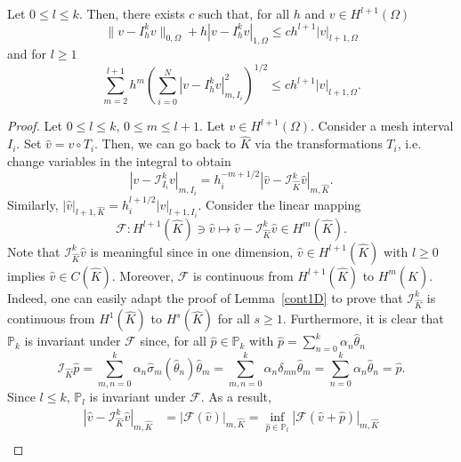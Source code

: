 \begin{lemma}\label{interpolationerrPk}
    Let $0 \le l \le k$. Then, there exists $c$ such that, for all $h$ and $v \in H^{l+1}(\Omega)$
    \begin{equation*}
\|v - I_h^k v\|_{0,\Omega} + h |v - I_h^k v|_{1,\Omega} \le c h^{l+1} |v|_{l+1,\Omega}
\end{equation*}
    and for $l \ge 1$
    \begin{equation*}
\sum_{m=2}^{l+1} h^m \left(\sum_{i=0}^N |v - I_h^k v|_{m,I_i}^2\right)^{1/2} \le c h^{l+1} |v|_{l+1,\Omega}.
\end{equation*}
\begin{proof}
    Let $0 \le l \le k$, $0 \le m \le l+1$. Let $v \in H^{l+1}(\Omega)$.
    Consider a mesh interval $I_i$. Set $\hat{v} = v \circ T_i$. Then, we can go back to $\hat{K}$ via the transformations $T_i$, i.e. change variables in the integral to obtain
    \begin{equation*}
|v - \mathcal{I}_{I_i}^k v|_{m,I_i} = h_i^{-m+1/2} |\hat{v} - \mathcal{I}_{\hat{K}}^k \hat{v}|_{m,\hat{K}}.
\end{equation*}
    Similarly, $|\hat{v}|_{l+1,\hat{K}} = h_i^{l+1/2} |v|_{l+1,I_i}$. 
    Consider the linear mapping
    \begin{equation*}
\mathcal{F}: H^{l+1}(\hat{K}) \ni \hat{v} \mapsto \hat{v} - \mathcal{I}_{\hat{K}}^k \hat{v} \in H^m(\hat{K}).
\end{equation*}
    Note that $\mathcal{I}_{\hat{K}}^k \hat{v}$ is meaningful since in one dimension, $\hat{v} \in H^{l+1}(\hat{K})$ with $l \ge 0$ implies $\hat{v} \in C(\hat{K})$. Moreover, $\mathcal{F}$ is continuous from $H^{l+1}(\hat{K})$ to $H^m(\hat{K})$. Indeed, one can easily adapt the proof of Lemma~\ref{cont1D} to prove that $\mathcal{I}_{\hat{K}}^k$ is continuous from $H^1(\hat{K})$ to $H^s(\hat{K})$ for all $s \ge 1$. Furthermore, it is clear that $\mathbb{P}_k$ is invariant under $\mathcal{F}$ since, for all $\hat{p} \in \mathbb{P}_k$ with $\hat{p} = \sum_{n=0}^k \alpha_n \hat{\theta}_n$
    \begin{equation*}
\mathcal{I}_{\hat{K}} \hat{p} = \sum_{m,n=0}^k \alpha_n \hat{\sigma}_m(\hat{\theta}_n) \hat{\theta}_m = \sum_{m,n=0}^k \alpha_n \delta_{mn} \hat{\theta}_m = \sum_{n=0}^k \alpha_n \hat{\theta}_n = \hat{p}.
\end{equation*}
    Since $l \le k$, $\mathbb{P}_l$ is invariant under $\mathcal{F}$. As a result,
    \begin{align*}
        |\hat{v} - \mathcal{I}_{\hat{K}}^k \hat{v}|_{m,\hat{K}} &= |\mathcal{F}(\hat{v})|_{m,\hat{K}} = \inf_{\hat{p} \in \mathbb{P}_l} |\mathcal{F}(\hat{v} + \hat{p})|_{m,\hat{K}} \\

\end{align*}
\end{proof}
\end{lemma}
